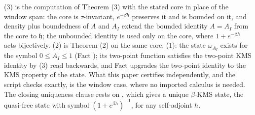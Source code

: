(3) is the computation of Theorem (3) with the stated core in place of the window span: the core is $\tau$-invariant, $e^{-\beta h}$ preserves it and is bounded on it, and density plus boundedness of $A$ and $A_I$ extend the bounded identity $A = A_I$ from the core to $\mathfrak{h}$; the unbounded identity is used only on the core, where $1 + e^{-\beta h}$ acts bijectively. (2) is Theorem (2) on the same core. (1): the state $\omega_{A_I}$ exists for the symbol $0 \le A_I \le 1$ (Fact ); its two-point function satisfies the two-point KMS identity by (3) read backwards, and Fact  upgrades the two-point identity to the KMS property of the state. What this paper certifies independently, and the script checks exactly, is the window case, where no imported calculus is needed. The closing uniqueness clause rests on , which gives a unique $\beta$-KMS state, the quasi-free state with symbol $(1 + e^{\beta h})^{-1}$, for any self-adjoint $h$.
